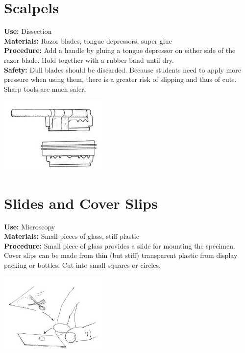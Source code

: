 \begin{multicols}{2}
\section{Scalpels} 
\label{sec:scalpels}
\vspace{-10pt}
\textbf{Use:} Dissection\\
\textbf{Materials:} Razor blades, tongue depressors, super glue\\
\textbf{Procedure:} Add a handle by gluing a tongue depressor on either side of the razor blade. Hold together with a rubber band until dry.\\
\textbf{Safety:} Dull blades should be discarded. Because students need to apply more pressure when using them, there is a greater risk of slipping and thus of cuts. Sharp tools are much safer. 
\begin{center}
\includegraphics[width=0.4\textwidth]{./img/source/scalpel.jpg}
\end{center}

\section{Slides and Cover Slips}  
\label{sec:slide-cover-slip}
\vspace{-10pt}
\textbf{Use:} Microscopy\\
\textbf{Materials:} Small pieces of glass, stiff plastic\\
\textbf{Procedure:} Small piece of glass provides a slide for mounting the
specimen. Cover slips can be made
from thin (but stiff) transparent plastic from
display packing or bottles. Cut into small squares or circles.
\begin{center}
\includegraphics[width=0.4\textwidth]{./img/source/slide-cover-slip.jpg}
\end{center}


\end{multicols}
